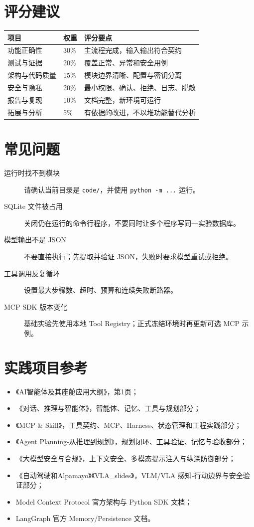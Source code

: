 \documentclass[UTF8,zihao=-4]{ctexart}
\begin{document}
\section{评分建议}

\begin{table}[htbp]
\centering
\begin{tabularx}{\textwidth}{L{4cm} C{2cm} Y}
\toprule
项目 & 权重 & 评分要点\\
\midrule
功能正确性 & 30\% & 主流程完成，输入输出符合契约\\
测试与证据 & 20\% & 覆盖正常、异常和安全用例\\
架构与代码质量 & 15\% & 模块边界清晰、配置与密钥分离\\
安全与隐私 & 20\% & 最小权限、确认、拒绝、日志、脱敏\\
报告与复现 & 10\% & 文档完整，新环境可运行\\
拓展与分析 & 5\% & 有依据的改进，不以堆功能替代分析\\
\bottomrule
\end{tabularx}
\end{table}

\section{常见问题}

\begin{description}
  \item[运行时找不到模块] 请确认当前目录是 \texttt{code/}，并使用 \texttt{python -m ...} 运行。
  \item[SQLite 文件被占用] 关闭仍在运行的命令行程序，不要同时让多个程序写同一实验数据库。
  \item[模型输出不是 JSON] 不要直接执行；先提取并验证 JSON，失败时要求模型重试或拒绝。
  \item[工具调用反复循环] 设置最大步骤数、超时、预算和连续失败断路器。
  \item[MCP SDK 版本变化] 基础实验先使用本地 Tool Registry；正式冻结环境时再更新可选 MCP 示例。
\end{description}

\section{实践项目参考}

\begin{itemize}
  \item 《AI智能体及其座舱应用大纲》，第1页；
  \item 《对话、推理与智能体》，智能体、记忆、工具与规划部分；
  \item 《MCP \& Skill》，工具契约、MCP、Harness、状态管理和工程实践部分；
  \item 《Agent Planning-从推理到规划》，规划闭环、工具验证、记忆与验收部分；
  \item 《大模型安全与合规》，上下文安全、多模态提示注入与纵深防御部分；
  \item 《自动驾驶和Alpamayo》《VLA\_slides》，VLM/VLA 感知-行动边界与安全验证部分；
  \item Model Context Protocol 官方架构与 Python SDK 文档；
  \item LangGraph 官方 Memory/Persistence 文档。
\end{itemize}
\end{document}
